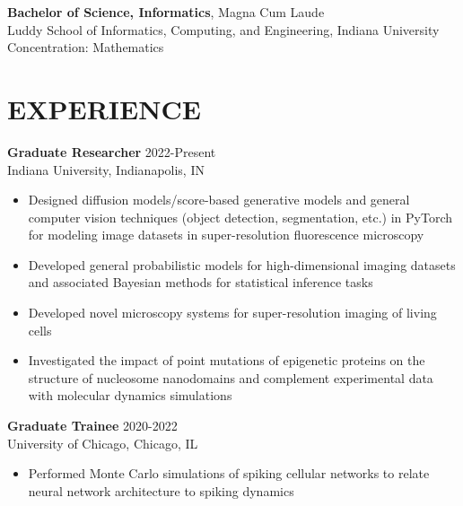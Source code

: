 \documentclass[margin, 10pt]{res} %
\begin{document}
\begin{resume}
\textbf{Bachelor of Science, Informatics}, Magna Cum Laude\\
Luddy School of Informatics, Computing, and Engineering, Indiana University\\
Concentration: Mathematics 
  
 
\section{EXPERIENCE}

\textbf{Graduate Researcher} \hfill 2022-Present \\
Indiana University, Indianapolis, IN

\begin{itemize} \itemsep -2pt %

\item Designed diffusion models/score-based generative models and general computer vision techniques (object detection, segmentation, etc.) in PyTorch for modeling image datasets in super-resolution fluorescence microscopy

\item Developed general probabilistic models for high-dimensional imaging datasets and associated Bayesian methods for statistical inference tasks

\item Developed novel microscopy systems for super-resolution imaging of living cells 

\item Investigated the impact of point mutations of epigenetic proteins on the structure of nucleosome nanodomains and complement experimental data with molecular dynamics simulations


\end{itemize}

\textbf{Graduate Trainee} \hfill 2020-2022 \\
University of Chicago, Chicago, IL

\begin{itemize} \itemsep -2pt %

\item Performed Monte Carlo simulations of spiking cellular networks to relate neural network architecture to spiking dynamics


\end{itemize}
\end{resume}
\end{document}
